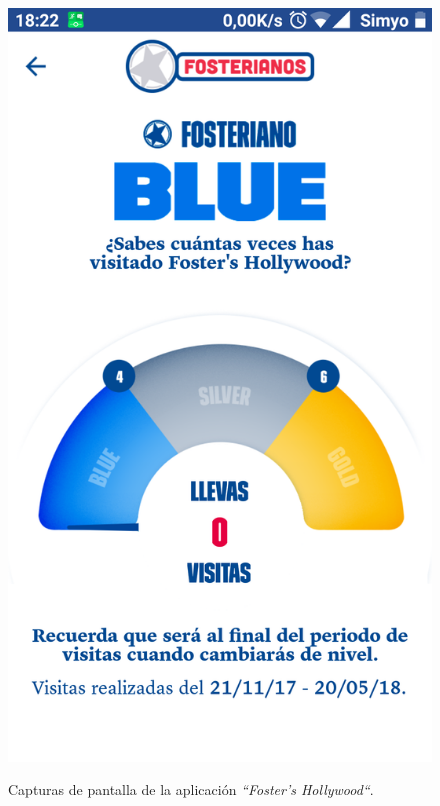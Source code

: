 \documentclass[twoside]{report}
\begin{document}
\begin{figure}[H]
\begin{center}
\includegraphics[scale=0.25]{images/restaurantes/foster2.png}
\caption{Capturas de pantalla de la aplicación \textit{“Foster's Hollywood“}.} \cite{fostersh}
\end{center}
\end{figure}
\end{document}
